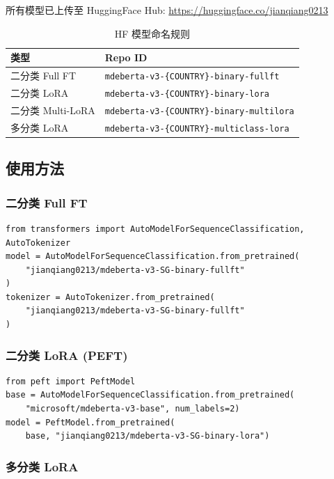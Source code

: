 \documentclass[11pt,a4paper]{article}
\begin{document}
所有模型已上传至 HuggingFace Hub:
\url{https://huggingface.co/jianqiang0213}

\begin{table}[h]\centering
\caption{HF 模型命名规则}\label{tab:hf-names}
\begin{tabular}{@{}ll@{}}
\toprule
\textbf{类型} & \textbf{Repo ID} \\
\midrule
二分类 Full FT & \texttt{mdeberta-v3-\{COUNTRY\}-binary-fullft} \\
二分类 LoRA & \texttt{mdeberta-v3-\{COUNTRY\}-binary-lora} \\
二分类 Multi-LoRA & \texttt{mdeberta-v3-\{COUNTRY\}-binary-multilora} \\
多分类 LoRA & \texttt{mdeberta-v3-\{COUNTRY\}-multiclass-lora} \\
\bottomrule
\end{tabular}
\end{table}

\subsection{使用方法}

\subsubsection{二分类 Full FT}

\begin{verbatim}
from transformers import AutoModelForSequenceClassification, AutoTokenizer
model = AutoModelForSequenceClassification.from_pretrained(
    "jianqiang0213/mdeberta-v3-SG-binary-fullft"
)
tokenizer = AutoTokenizer.from_pretrained(
    "jianqiang0213/mdeberta-v3-SG-binary-fullft"
)
\end{verbatim}

\subsubsection{二分类 LoRA (PEFT)}

\begin{verbatim}
from peft import PeftModel
base = AutoModelForSequenceClassification.from_pretrained(
    "microsoft/mdeberta-v3-base", num_labels=2)
model = PeftModel.from_pretrained(
    base, "jianqiang0213/mdeberta-v3-SG-binary-lora")
\end{verbatim}

\subsubsection{多分类 LoRA}
\end{document}
